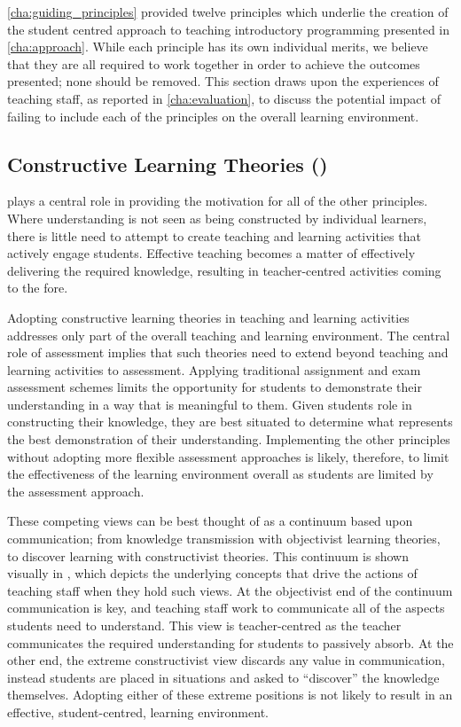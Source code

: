 \cref{cha:guiding_principles} provided twelve principles which underlie the creation of the student centred approach to teaching introductory programming presented in \cref{cha:approach}. While each principle has its own individual merits, we believe that they are all required to work together in order to achieve the outcomes presented; none should be removed. This section draws upon the experiences of teaching staff, as reported in \cref{cha:evaluation}, to discuss the potential impact of failing to include each of the principles on the overall learning environment.

\subsection{Constructive Learning Theories ()} %
\label{sub:constructive_learning_theories}

 plays a central role in providing the motivation for all of the other principles. Where understanding is not seen as being constructed by individual learners, there is little need to attempt to create teaching and learning activities that actively engage students. Effective teaching becomes a matter of effectively delivering the required knowledge, resulting in teacher-centred activities coming to the fore. 

Adopting constructive learning theories in teaching and learning activities addresses only part of the overall teaching and learning environment. The central role of assessment implies that such theories need to extend beyond teaching and learning activities to assessment. Applying traditional assignment and exam assessment schemes limits the opportunity for students to demonstrate their understanding in a way that is meaningful to them. Given students role in constructing their knowledge, they are best situated to determine what represents the best demonstration of their understanding. Implementing the other principles without adopting more flexible assessment approaches is likely, therefore, to limit the effectiveness of the learning environment overall as students are limited by the assessment approach.

These competing views can be best thought of as a continuum based upon communication; from knowledge transmission with objectivist learning theories, to discover learning with constructivist theories. This continuum is shown visually in , which depicts the underlying concepts that drive the actions of teaching staff when they hold such views. At the objectivist end of the continuum communication is key, and teaching staff work to communicate all of the aspects students need to understand. This view is teacher-centred as the teacher communicates the required understanding for students to passively absorb. At the other end, the extreme constructivist view discards any value in communication, instead students are placed in situations and asked to ``discover'' the knowledge themselves. Adopting either of these extreme positions is not likely to result in an effective, student-centred, learning environment.

